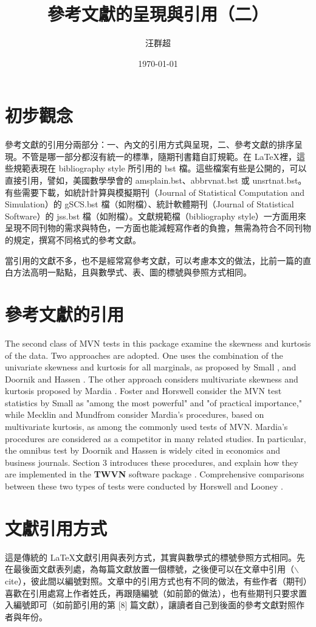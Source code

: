 \documentclass[12pt, a4paper]{article}
\title{ {\MB 參考文獻的呈現與引用（二）}}		%
\author{{\SM 汪群超}}						%
\date{{\TT \today }}
\begin{document}
\maketitle
\fontsize{12}{22pt}\selectfont 
\section{初步觀念}
參考文獻的引用分兩部分：一、內文的引用方式與呈現，二、參考文獻的排序呈現。不管是哪一部分都沒有統一的標準，隨期刊書籍自訂規範。在   \LaTeX 裡，這些規範表現在 bibliography style 所引用的 bst 檔。這些檔案有些是公開的，可以直接引用，譬如，美國數學學會的 amsplain.bst、abbrvnat.bst 或 unsrtnat.bst。有些需要下載，如統計計算與模擬期刊（Journal of Statistical Computation and Simulation）的 gSCS.bst 檔（如附檔）、統計軟體期刊（Journal of Statistical Software）的 jss.bst 檔（如附檔）。文獻規範檔（bibliography style）一方面用來呈現不同刊物的需求與特色，一方面也能減輕寫作者的負擔，無需為符合不同刊物的規定，撰寫不同格式的參考文獻。

當引用的文獻不多，也不是經常寫參考文獻，可以考慮本文的做法，比前一篇的直白方法高明一點點，且與數學式、表、圖的標號與參照方式相同。

\section{參考文獻的引用}
The second class of MVN tests in this package examine the skewness and kurtosis of the data. Two approaches are adopted. One uses the combination of the univariate skewness and kurtosis for all marginals, as proposed by Small \cite{SMALL:1980}, and Doornik and Hassen \cite{DOORNIK:2008}. The other approach considers multivariate skewness and kurtosis proposed by Mardia \cite{MARDIA:1970}.   Foster \cite{FOSTER:1981} and Horswell \cite{HORSWELL:1990} consider the MVN test statistics by Small as "among the most powerful" and "of practical importance,"  while  Mecklin and Mundfrom \cite{MM} consider Mardia's procedures, based on multivariate kurtosis, as among the commonly used tests of MVN.  Mardia's procedures are considered as a competitor  in many related studies.
In particular, the omnibus test by  Doornik and Hassen \cite{DOORNIK:2008} is widely cited in economics and business journals. Section 3 introduces these procedures, and explain how they are implemented in the \textbf{TWVN}  software package \cite{WH}. Comprehensive  comparisons between these two types of tests were conducted by Horswell and Looney \cite{HORSWELL:1992}.

\section{文獻引用方式}
這是傳統的 \LaTeX 文獻引用與表列方式，其實與數學式的標號參照方式相同。先在最後面文獻表列處，為每篇文獻放置一個標號，之後便可以在文章中引用（$\backslash$cite），彼此間以編號對照。文章中的引用方式也有不同的做法，有些作者（期刊）喜歡在引用處寫上作者姓氏，再跟隨編號（如前節的做法），也有些期刊只要求置入編號即可（如前節引用的第  [8] 篇文獻），讓讀者自己到後面的參考文獻對照作者與年份。
\end{document}
